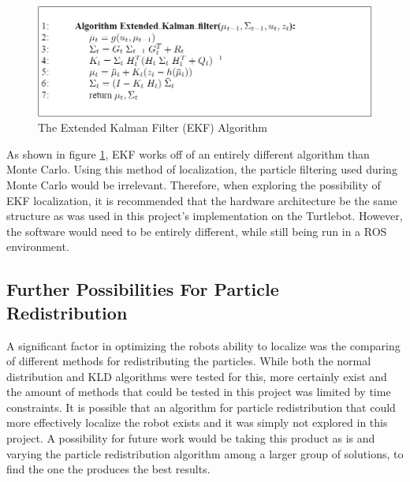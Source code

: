 \documentclass{article}
\newcommand\tab[1][0.5cm]{\hspace*{#1}}
\begin{document}
\begin{figure}[h!]
\centering
\includegraphics[scale=0.45]{ekf_algorithm.PNG}
\caption{The Extended Kalman Filter (EKF) Algorithm}
\label{fig:ekf}
\end{figure}

As shown in figure \ref{fig:ekf}, EKF works off of an entirely different algorithm than Monte Carlo. Using this method of localization, the particle filtering used during Monte Carlo would be irrelevant. Therefore, when exploring the possibility of EKF localization, it is recommended that the hardware architecture be the same structure as was used in this project's implementation on the Turtlebot. However, the software would need to be entirely different, while still being run in a ROS environment.\\

\subsection{Further Possibilities For Particle Redistribution}
\tab A significant factor in optimizing the robots ability to localize was the comparing of different methods for redistributing the particles. While both the normal distribution and KLD algorithms were tested for this, more certainly exist and the amount of methods that could be tested in this project was limited by time constraints. It is possible that an algorithm for particle redistribution that could more effectively localize the robot exists and it was simply not explored in this project. A possibility for future work would be taking this product as is and varying the particle redistribution algorithm among a larger group of solutions, to find the one the produces the best results.\\
\end{document}
